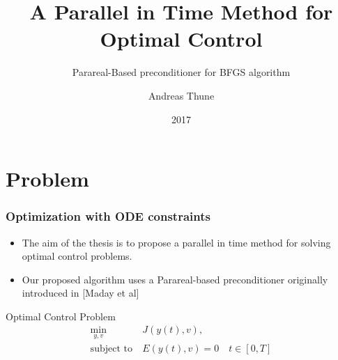 \documentclass[9pt]{beamer}
\title{A Parallel in Time Method for Optimal Control}
\subtitle{Parareal-Based preconditioner for BFGS algorithm}
\author{Andreas Thune}
\date{2017}
\begin{document}
 
\frame{\titlepage}
\tableofcontents
\section{Problem}

\begin{frame}
\frametitle{Optimization with ODE constraints}
\begin{itemize}
\item{The aim of the thesis is to propose a parallel in time method for solving optimal control problems.}
\item{Our proposed algorithm uses a Parareal-based preconditioner originally introduced in [Maday et al] }
\end{itemize}
\begin{block}{Optimal Control Problem}
\begin{align*}
\min_{y,v} &J(y(t),v), \\
\textrm{subject to} \ &E(y(t),v)=0\quad t\in[0,T]
\end{align*}
\end{block}
\end{frame}
\end{document}

